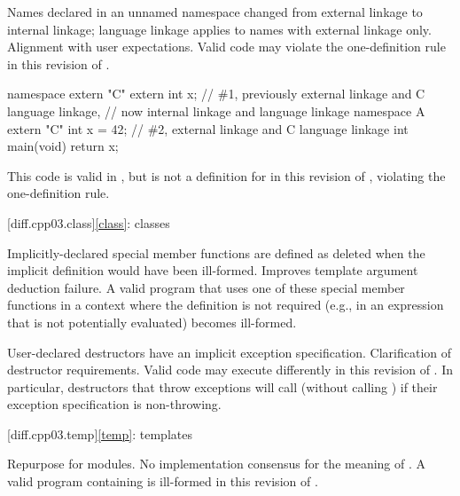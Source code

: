 \change
Names declared in an unnamed namespace
changed from external linkage to internal linkage;
language linkage applies to names with external linkage only.
\rationale
Alignment with user expectations.
\effect
Valid \CppIII{} code may violate the one-definition rule
in this revision of \Cpp{}.
\begin{example}
\begin{codeblock}
namespace { extern "C" { extern int x; } }  // \#1, previously external linkage and C language linkage,
                                            // now internal linkage and \Cpp{} language linkage
namespace A { extern "C" int x = 42; }      // \#2, external linkage and C language linkage
int main(void) { return x; }
\end{codeblock}
This code is valid in \CppIII{},
but  is not a definition for 
in this revision of \Cpp{}, violating the one-definition rule.
\end{example}

[diff.cpp03.class]{\ref*{class}: classes}

\change
Implicitly-declared special member functions are defined as deleted
when the implicit definition would have been ill-formed.
\rationale
Improves template argument deduction failure.
\effect
A valid \CppIII{} program that uses one of these special member functions in a
context where the definition is not required (e.g., in an expression that is
not potentially evaluated) becomes ill-formed.

\change
User-declared destructors have an implicit exception specification.
\rationale
Clarification of destructor requirements.
\effect
Valid \CppIII{} code may execute differently in this revision of \Cpp{}. In
particular, destructors that throw exceptions will call 
(without calling ) if their exception specification is
non-throwing.

[diff.cpp03.temp]{\ref*{temp}: templates}

\change
Repurpose  for modules.
\rationale
No implementation consensus for the \CppIII{} meaning of .
\effect
A valid \CppIII{} program containing  is ill-formed in this
revision of \Cpp{}.

